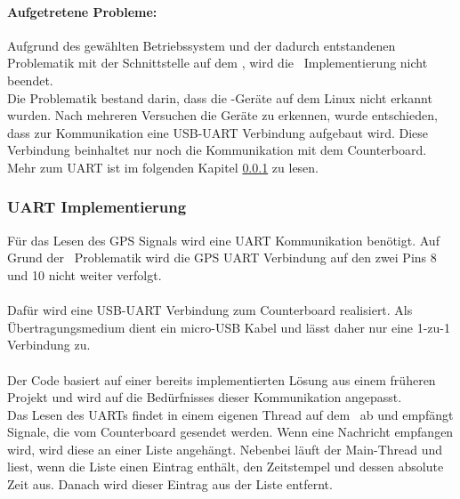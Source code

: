 \paragraph{Aufgetretene Probleme:}
Aufgrund des gewählten Betriebssystem und der dadurch entstandenen Problematik mit der Schnittstelle auf dem \rpi, wird die \iic\ Implementierung nicht beendet.\\
Die Problematik bestand darin, dass die \iic-Geräte auf dem Linux nicht erkannt wurden. Nach mehreren Versuchen die Geräte zu erkennen, wurde entschieden, dass zur Kommunikation eine USB-UART Verbindung aufgebaut wird. Diese Verbindung beinhaltet nur noch die Kommunikation mit dem Counterboard. Mehr zum UART ist im folgenden Kapitel \ref{sec:uart} zu lesen.

\clearpage
\subsubsection{UART Implementierung}\label{sec:uart}%
Für das Lesen des GPS Signals wird eine UART Kommunikation benötigt.
Auf Grund der \iic\ Problematik wird die GPS UART Verbindung auf den zwei Pins 8 und 10 nicht weiter verfolgt.\\
\\
Dafür wird eine USB-UART Verbindung zum Counterboard realisiert. Als Übertragungsmedium dient ein micro-USB Kabel und lässt daher nur eine 1-zu-1 Verbindung zu.\\
\\
Der Code basiert auf einer bereits implementierten Lösung aus einem früheren Projekt und wird auf die Bedürfnisses dieser Kommunikation angepasst.\\
Das Lesen des UARTs findet in einem eigenen Thread auf dem \rpi\ ab und empfängt Signale, die vom Counterboard gesendet werden. Wenn eine Nachricht empfangen wird, wird diese an einer Liste angehängt. Nebenbei läuft der Main-Thread und liest, wenn die Liste einen Eintrag enthält, den Zeitstempel und dessen absolute Zeit aus. Danach wird dieser Eintrag aus der Liste entfernt.